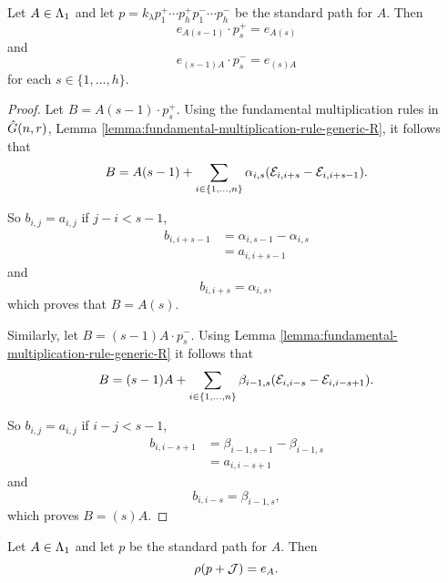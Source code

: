 \documentclass[a4paper, 11pt]{report}
\begin{document}
\begin{lemma}\label{lemma:slice-by-slice}
Let $A\in\Lambda_1{}$ and let $p=k_\lambda p_1^+ \cdots p_h^+ p_1^-\cdots p_h^-$ be the standard path for $A$. Then
\begin{equation*}
e_{A(s-1)}\cdot p_s^+ = e_{A(s)}
\end{equation*}
and
\begin{equation*}
e_{(s-1)A}\cdot p_s^- = e_{(s)A}
\end{equation*}
for each $s\in\{1,\ldots,h\}$.
\end{lemma}

\begin{proof}
Let $B=A(s-1)\cdot p_s^+$. Using the fundamental multiplication rules in $\hat{G}(n,r)$, Lemma \ref{lemma:fundamental-multiplication-rule-generic-R}, it follows that
\begin{equation*}
B = A(s-1) + \sum_{i\in\{1,\ldots,n\}} \alpha_{i,s}(\mathcal{E}_{i,i+s} -\mathcal{E}_{i,i+s-1}).
\end{equation*}

So $b_{i,j}=a_{i,j}$ if $j-i<s-1$,
\begin{align*}
b_{i,i+s-1}
&= \alpha_{i,s-1}-\alpha_{i,s}\\
&= a_{i,i+s-1}
\end{align*}
and
\begin{equation*}
b_{i,i+s} = \alpha_{i,s},
\end{equation*}
which proves that $B=A(s)$.

Similarly, let $B=(s-1)A\cdot p_s^-$. Using Lemma \ref{lemma:fundamental-multiplication-rule-generic-R} it follows that
\begin{equation*}
B = (s-1)A + \sum_{i\in\{1,\ldots,n\}} \beta_{i-1,s}(\mathcal{E}_{i,i-s} - \mathcal{E}_{i,i-s+1}).
\end{equation*}

So $b_{i,j}=a_{i,j}$ if $i-j<s-1$,
\begin{align*}
b_{i,i-s+1}
&= \beta_{i-1,s-1} - \beta_{i-1,s}\\
&= a_{i,i-s+1}
\end{align*}
and
\begin{equation*}
b_{i,i-s} = \beta_{i-1,s},
\end{equation*}
which proves $B=(s)A$.
\end{proof}

\begin{lemma}\label{lemma:image-of-standard-path-generic}
Let $A\in\Lambda_1{}$ and let $p$ be the standard path for $A$. Then
\begin{equation*}
\rho(p+\mathcal{J}) = e_A.
\end{equation*}
\end{lemma}
\end{document}
